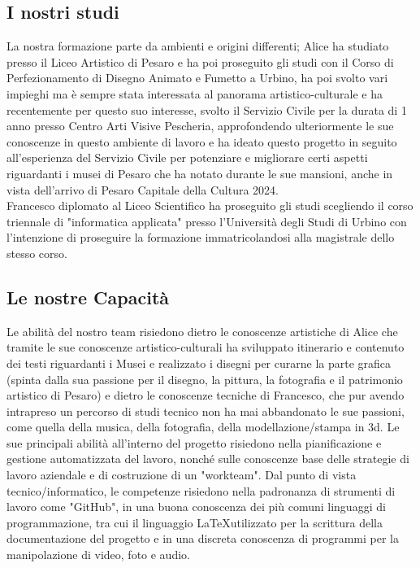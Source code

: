\documentclass[hidelinks,12pt,a4paper]{article}
\begin{document}
\begin{flushleft}
				\subsection{I nostri studi}
				La nostra formazione parte da ambienti e origini differenti;
				Alice ha studiato presso il Liceo Artistico di Pesaro e ha poi proseguito gli studi con il Corso di Perfezionamento di Disegno Animato e Fumetto a Urbino, ha poi svolto vari impieghi ma è sempre stata interessata al panorama artistico-culturale e ha recentemente per questo suo interesse, svolto il Servizio Civile per la durata di 1 anno presso Centro Arti Visive Pescheria, approfondendo ulteriormente le sue conoscenze in questo ambiente di lavoro e ha ideato questo progetto in seguito all'esperienza del Servizio Civile per potenziare e migliorare certi aspetti riguardanti i musei di Pesaro che ha notato durante le sue mansioni, anche in vista dell'arrivo di Pesaro Capitale della Cultura 2024.\\
				Francesco diplomato al Liceo Scientifico ha proseguito gli studi scegliendo il corso triennale di "informatica applicata" presso l'Università degli Studi di Urbino con l'intenzione di proseguire la formazione immatricolandosi alla magistrale dello stesso corso.  
				
				\subsection{Le nostre Capacità}
				Le abilità del nostro team risiedono dietro le conoscenze artistiche di Alice
				che tramite le sue conoscenze artistico-culturali ha sviluppato itinerario e contenuto dei testi riguardanti i Musei e realizzato i disegni per curarne la parte grafica (spinta dalla sua passione per il disegno, la pittura, la fotografia e il patrimonio artistico di Pesaro)
				e dietro le conoscenze tecniche di Francesco, che pur avendo intrapreso un percorso di studi tecnico non ha mai abbandonato le sue passioni, come quella della musica, della fotografia, della modellazione/stampa in 3d. Le sue principali abilità all'interno del progetto risiedono nella pianificazione e gestione automatizzata del lavoro, nonché sulle conoscenze base delle strategie di lavoro aziendale e di costruzione di un "workteam". Dal punto di vista tecnico/informatico, le competenze risiedono nella padronanza di strumenti di lavoro come "GitHub", in una buona conoscenza dei più comuni linguaggi di programmazione, tra cui il linguaggio \LaTeX utilizzato per la scrittura della documentazione del progetto e in una discreta conoscenza di programmi per la manipolazione di video, foto e audio.
				

\end{flushleft}
\end{document}
